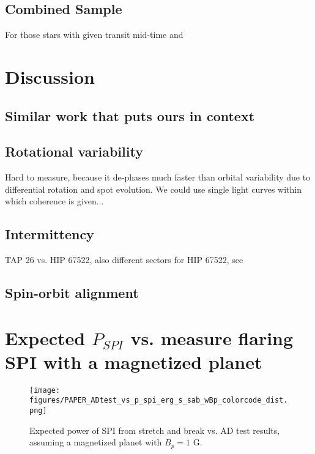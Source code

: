 \documentclass[twocolumn]{aastex631}
\begin{document}
\subsection{Combined Sample}

For those stars with given transit mid-time and 
\section{Discussion}
\label{sec:discussion}

\subsection{Similar work that puts ours in context}

\subsection{Rotational variability}
Hard to measure, because it de-phases much faster than orbital variability due to differential rotation and spot evolution. We could use single light curves within which coherence is given...

\subsection{Intermittency}

TAP 26 vs. HIP 67522, also different sectors for HIP 67522, see \cite{shkolnik2008nature}

\subsection{Spin-orbit alignment}



\appendix
\section{Expected $P_{SPI}$ vs. measure flaring SPI with a magnetized planet}

\begin{figure*}[ht!]
    \begin{centering}
        \texttt{[image: figures/PAPER\_ADtest\_vs\_p\_spi\_erg\_s\_sab\_wBp\_colorcode\_dist.png]}
        \caption{
            Expected power of SPI from stretch and break vs. AD test results, assuming a magnetized planet with $B_p=1$ G. 
        }
        \label{appendix:fig:adtest_p_spi_erg_s}
    \end{centering}
\end{figure*}
\end{document}
